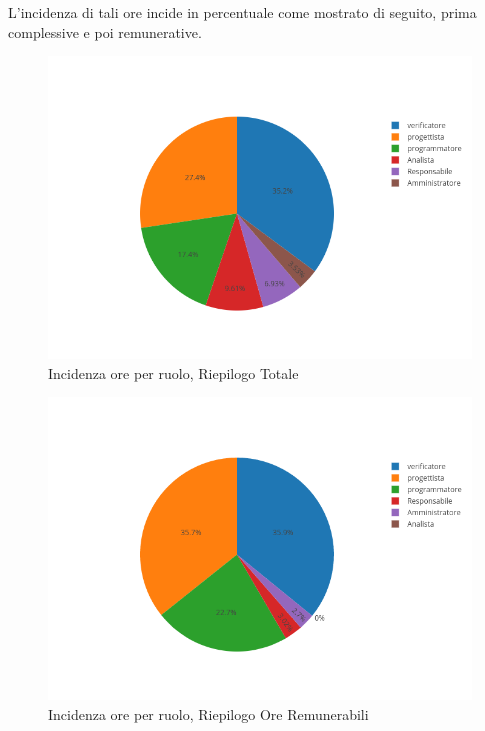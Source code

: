L'incidenza di tali ore incide in percentuale come mostrato di seguito, prima complessive e poi remunerative.
\begin{figure}[H]
	\centering
	\includegraphics[scale=0.6]{img/OreTotali.png}
	\caption{Incidenza ore per ruolo, Riepilogo Totale}
\end{figure}
\begin{figure}[H]
	\centering
	\includegraphics[scale=0.6]{img/OreRendicontabili.png}
	\caption{Incidenza ore per ruolo, Riepilogo Ore Remunerabili}
\end{figure}

